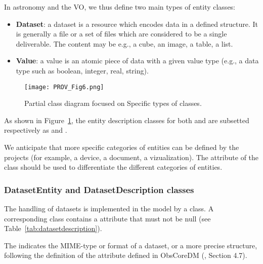 In astronomy and the VO, we thus define two main types of entity classes:

\begin{itemize}
    \item \textbf{Dataset}: a dataset is a resource which encodes data in a defined structure. It is generally a file or a set of files which are considered to be a single deliverable. The content may be e.g., a cube, an image, a table, a list.
    \item \textbf{Value}: a value is an atomic piece of data with a given value type (e.g., a data type such as boolean, integer, real, string).
\end{itemize}

\begin{figure}[ht]
\centering
\texttt{[image: PROV\_Fig6.png]}
\caption[Partial class diagram focused on specific types of  classes.]{Partial class diagram focused on Specific types of  classes.}
\label{fig:classdiagram_entityclasses}
\end{figure}

As shown in Figure~\ref{fig:classdiagram_entityclasses}, the entity description classes for both  and  are subsetted respectively as  and .

We anticipate that more specific categories of entities can be defined by the projects (for example, a device, a document, a vizualization). The  attribute of the  class should be used to differentiate the different categories of entities.


\subsubsection{DatasetEntity and DatasetDescription classes}

The handling of datasets is implemented in the model by a  class. A corresponding  class contains a  attribute that must not be null (see Table~\ref{tab:datasetdescription}).

The  indicates the MIME-type or format of a dataset, or a more precise structure, following the definition of the attribute  defined in ObsCoreDM (\citet{2017ivoa.spec.0509L}, Section 4.7).

